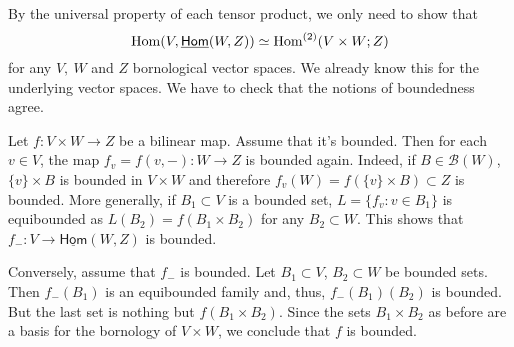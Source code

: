 \begin{solution}
    By the universal property of each tensor product, we only need to show that \[\operatorname{Hom}(V, \underline{\mathsf{Hom}}(W, Z)) \simeq \operatorname{Hom}^{(2)}(V\times W; Z)\] for any $V,\ W$ and $Z$ bornological vector spaces. We already know this for the underlying vector spaces. We have to check that the notions of boundedness agree.

    Let $f: V\times W\to Z$ be a bilinear map. Assume that it's bounded. Then for each $v\in V$, the map $f_v=f(v,-):W\to Z$ is bounded again. Indeed, if $B\in \mathcal{B}(W)$, $\{v\}\times B$ is bounded in $V\times W$ and therefore $f_v(W)=f(\{v\}\times B)\subset Z$ is bounded. More generally, if $B_1\subset V$ is a bounded set, $L=\{f_v:v\in B_1\}$ is equibounded as $L(B_2)=f(B_1\times B_2)$ for any $B_2\subset W$. This shows that $f_-:V\to \underline{\mathsf{Hom}}(W,Z)$ is bounded.  

    Conversely, assume that $f_-$ is bounded. Let $B_1\subset V$, $B_2\subset W$ be bounded sets. Then $f_-(B_1)$ is an equibounded family and, thus, $f_-(B_1)(B_2)$ is bounded. But the last set is nothing but $f(B_1\times B_2)$. Since the sets $B_1\times B_2$ as before are a basis for the bornology of $V\times W$, we conclude that $f$ is bounded.
\end{solution}




